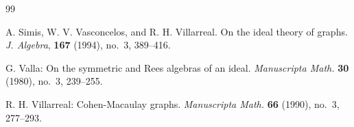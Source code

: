 \documentclass[11pt,a4paper,reqno]{amsart}
\theoremstyle{definition}
\begin{document}
\begin{thebibliography}{99}

 A. Simis, W. V. Vasconcelos, and R. H. Villarreal. On the ideal theory of graphs. \textit{J. Algebra},
\textbf{167} (1994), no.~3, 389–416.
 
 G. Valla: On the symmetric and Rees algebras of an ideal. \emph{Manuscripta Math.} {\bf 30} (1980), no.~3, 239–255. 

 R. H. Villarreal: Cohen-Macaulay graphs. \emph{Manuscripta Math.} {\bf 66} (1990), no.~3, 277–293. 





\end{thebibliography}
\end{document}

